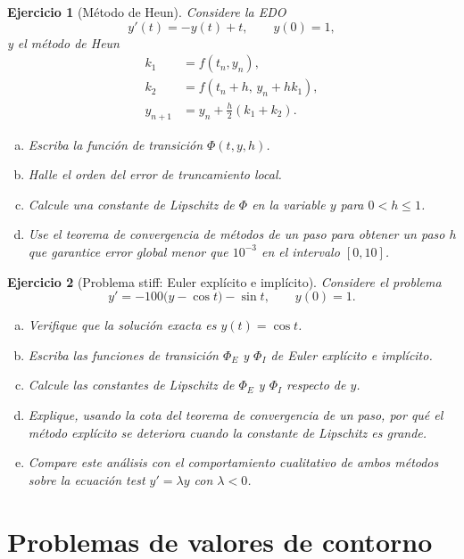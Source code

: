 \documentclass[12pt]{article}
\newtheorem{exercise}{Ejercicio}
\begin{document}
\begin{exercise}[Método de Heun]
Considere la EDO
\[
  y'(t)=-y(t)+t,\qquad y(0)=1,
\]
y el método de Heun
\begin{align*}
  k_1&=f(t_n,y_n),\\
  k_2&=f(t_n+h,\,y_n+hk_1),\\
  y_{n+1}&=y_n+\frac{h}{2}(k_1+k_2).
\end{align*}
\begin{enumerate}[(a)]
\item Escriba la función de transición $\Phi(t,y,h)$.
\item Halle el orden del error de truncamiento local.
\item Calcule una constante de Lipschitz de $\Phi$ en la variable $y$ para $0<h\le 1$.
\item Use el teorema de convergencia de métodos de un paso para obtener un paso $h$ que garantice error global menor que $10^{-3}$ en el intervalo $[0,10]$.
\end{enumerate}
\end{exercise}

\begin{exercise}[Problema stiff: Euler explícito e implícito]
Considere el problema
\[
  y'=-100\bigl(y-\cos t\bigr)-\sin t,\qquad y(0)=1.
\]
\begin{enumerate}[(a)]
\item Verifique que la solución exacta es $y(t)=\cos t$.
\item Escriba las funciones de transición $\Phi_E$ y $\Phi_I$ de Euler explícito e implícito.
\item Calcule las constantes de Lipschitz de $\Phi_E$ y $\Phi_I$ respecto de $y$.
\item Explique, usando la cota del teorema de convergencia de un paso, por qué el método explícito se deteriora cuando la constante de Lipschitz es grande.
\item Compare este análisis con el comportamiento cualitativo de ambos métodos sobre la ecuación test $y'=\lambda y$ con $\lambda<0$.
\end{enumerate}
\end{exercise}


\section*{Problemas de valores de contorno}
\end{document}
